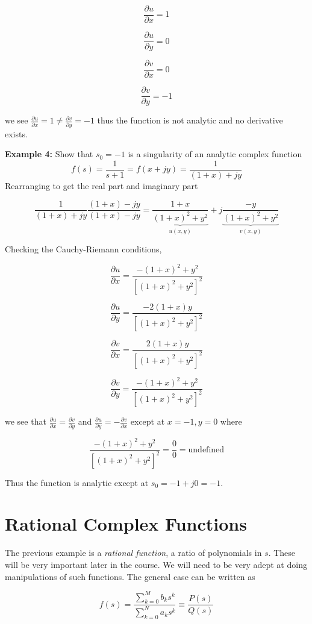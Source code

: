 \documentclass{article}
\begin{document}
\[
\frac{\partial u}{\partial x} = 1
\]

\[
\frac{\partial u}{\partial y} = 0
\]

\[
\frac{\partial v}{\partial x} = 0
\]

\[
\frac{\partial v}{\partial y} = -1
\]

we see $\frac{\partial u}{\partial x} = 1 \neq \frac{\partial v}{\partial y} = -1$ thus the function is not analytic and no derivative exists.

\textbf{Example 4:} Show that $s_0 = -1$ is a singularity of an analytic complex function
\[
f(s) = \frac{1}{s+1} = f(x +jy) = \frac{1}{(1+x) + jy}
\]
Rearranging to get the real part and imaginary part

\[
\frac{1}{(1+x) + jy}\frac{(1+x) - jy}{(1+x) - jy} = \underbrace{\frac{1+x}{(1+x)^2 + y^2}}_{u(x,y)} + j \underbrace{\frac{-y}{(1+x)^2 + y^2}}_{v(x,y)}
\]

Checking the Cauchy-Riemann conditions,

\[
\frac{\partial u}{\partial x} = \frac{-(1+x)^2 + y^2}{[(1+x)^2 + y^2]^2}
\]

\[
\frac{\partial u}{\partial y} = \frac{-2(1+x)y}{[(1+x)^2 + y^2]^2}
\]

\[
\frac{\partial v}{\partial x} = \frac{2(1+x)y}{[(1+x)^2 + y^2]^2}
\]

\[
\frac{\partial v}{\partial y} = \frac{-(1+x)^2 + y^2}{[(1+x)^2 + y^2]^2}
\]

we see that $\frac{\partial u}{\partial x} = \frac{\partial v}{\partial y}$ and $\frac{\partial u}{\partial y} = -\frac{\partial v}{\partial x}$ except at $x=-1, y = 0$ where

\[
\frac{-(1+x)^2 + y^2}{[(1+x)^2 + y^2]^2} = \frac{0}{0} = \text{undefined}
\]

Thus the function is analytic except at $s_0 = -1 + j0 = -1$.

\section{Rational Complex Functions}

The previous example is a \textit{rational function}, a ratio of polynomials in $s$. These will be very important later in the course. We will need to be very adept at doing manipulations of such functions. The general case can be written as

\[
f(s) = \frac{\sum\limits_{k=0}^M b_k s^k}{\sum\limits_{k=0}^N a_k s^k} \equiv \frac{P(s)}{Q(s)}
\]
\end{document}
